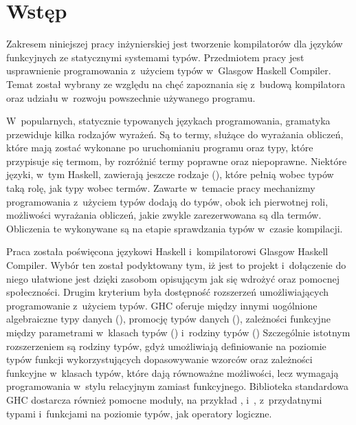 \chapter{Wstęp}\label{chap:wstep}

Zakresem niniejszej pracy inżynierskiej jest
tworzenie kompilatorów dla języków funkcyjnych ze statycznymi systemami typów.
Przedmiotem pracy jest usprawnienie
programowania z~użyciem typów w~Glasgow Haskell Compiler.
Temat został wybrany ze względu na chęć zapoznania się z~budową kompilatora oraz
udziału w~rozwoju powszechnie używanego programu.

W~popularnych, statycznie typowanych językach programowania, gramatyka przewiduje
kilka rodzajów wyrażeń. Są to termy, służące do wyrażania obliczeń, które mają zostać
wykonane po uruchomianiu programu oraz typy, które przypisuje się termom, by
rozróżnić termy poprawne oraz niepoprawne.
Niektóre języki, w~tym Haskell, zawierają jeszcze rodzaje (), które pełnią wobec
typów taką rolę, jak typy wobec termów. Zawarte w~temacie pracy mechanizmy programowania
z~użyciem typów dodają do typów, obok ich pierwotnej roli, możliwości
wyrażania obliczeń, jakie zwykle zarezerwowana są dla termów.
Obliczenia te wykonywane są na etapie sprawdzania typów w~czasie kompilacji.

Praca została poświęcona językowi Haskell i~kompilatorowi Glasgow Haskell
Compiler. Wybór ten został podyktowany tym, iż jest to projekt 
i~dołączenie do niego ułatwione jest dzięki zasobom opisującym jak się wdrożyć
oraz pomocnej społeczności.
Drugim kryterium była dostępność rozszerzeń umożliwiających
programowanie z~użyciem typów.
GHC oferuje między innymi uogólnione algebraiczne
typy danych (\cite{ExtPhantomTypes}\cite{ExtGADTs}),
promocję typów danych (\cite{ExtPromotion}),
zależności funkcyjne między parametrami w~klasach typów
(\cite{ExtFunDeps})
i~rodziny typów (\cite{ExtAssocTyFams}\cite{ExtAssocTypesWithClass}\cite{ExtClosedTyFams})
Szczególnie istotnym rozszerzeniem są rodziny typów, gdyż umożliwiają
definiowanie na poziomie typów funkcji wykorzystujących
dopasowywanie wzorców oraz zależności funkcyjne w~klasach typów,
które dają równoważne możliwości,
lecz wymagają programowania w~stylu relacyjnym zamiast funkcyjnego.
Biblioteka standardowa GHC dostarcza również pomocne moduły, na przykład ,
 i~, z~przydatnymi typami i~funkcjami na poziomie
typów, jak operatory logiczne.

